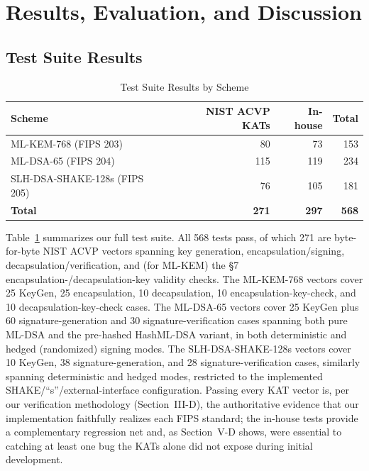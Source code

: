\documentclass[10pt,conference]{IEEEtran}
\begin{document}
\section{Results, Evaluation, and Discussion}

\subsection{Test Suite Results}

\begin{table}[!t]
\caption{Test Suite Results by Scheme}
\label{tab:tests}
\centering
\begin{tabular}{lrrr}
\toprule
Scheme & NIST ACVP KATs & In-house & Total \\
\midrule
ML-KEM-768 (FIPS 203)         & 80  & 73  & 153 \\
ML-DSA-65 (FIPS 204)          & 115 & 119 & 234 \\
SLH-DSA-SHAKE-128s (FIPS 205) & 76  & 105 & 181 \\
\midrule
\textbf{Total}                & \textbf{271} & \textbf{297} & \textbf{568} \\
\bottomrule
\end{tabular}
\end{table}

Table~\ref{tab:tests} summarizes our full test suite. All 568 tests
pass, of which 271 are byte-for-byte NIST ACVP vectors spanning key
generation, encapsulation/signing, decapsulation/verification, and (for
ML-KEM) the \S7 encapsulation-/decapsulation-key validity checks. The
ML-KEM-768 vectors cover 25 KeyGen, 25 encapsulation, 10 decapsulation,
10 encapsulation-key-check, and 10 decapsulation-key-check cases. The
ML-DSA-65 vectors cover 25 KeyGen plus 60 signature-generation and 30
signature-verification cases spanning both pure ML-DSA and the
pre-hashed HashML-DSA variant, in both deterministic and hedged
(randomized) signing modes. The SLH-DSA-SHAKE-128s vectors cover 10
KeyGen, 38 signature-generation, and 28 signature-verification cases,
similarly spanning deterministic and hedged modes, restricted to the
implemented SHAKE/``s''/external-interface configuration. Passing every
KAT vector is, per our verification methodology (Section~III-D), the
authoritative evidence that our implementation faithfully realizes each
FIPS standard; the in-house tests provide a complementary regression net
and, as Section~V-D shows, were essential to catching at least one bug
the KATs alone did not expose during initial development.
\end{document}
